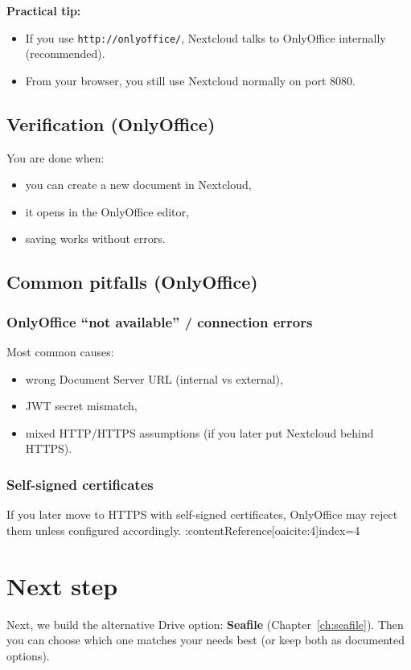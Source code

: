 \textbf{Practical tip:}
\begin{itemize}[leftmargin=*]
  \item If you use \texttt{http://onlyoffice/}, Nextcloud talks to OnlyOffice internally (recommended).
  \item From your browser, you still use Nextcloud normally on port 8080.
\end{itemize}

\subsection{Verification (OnlyOffice)}
You are done when:
\begin{itemize}[leftmargin=*]
  \item you can create a new document in Nextcloud,
  \item it opens in the OnlyOffice editor,
  \item saving works without errors.
\end{itemize}

\subsection{Common pitfalls (OnlyOffice)}
\subsubsection*{OnlyOffice ``not available'' / connection errors}
Most common causes:
\begin{itemize}[leftmargin=*]
  \item wrong Document Server URL (internal vs external),
  \item JWT secret mismatch,
  \item mixed HTTP/HTTPS assumptions (if you later put Nextcloud behind HTTPS).
\end{itemize}

\subsubsection*{Self-signed certificates}
If you later move to HTTPS with self-signed certificates, OnlyOffice may reject them unless configured accordingly. :contentReference[oaicite:4]{index=4}

\section{Next step}
Next, we build the alternative Drive option: \textbf{Seafile} (Chapter~\ref{ch:seafile}).
Then you can choose which one matches your needs best (or keep both as documented options). 